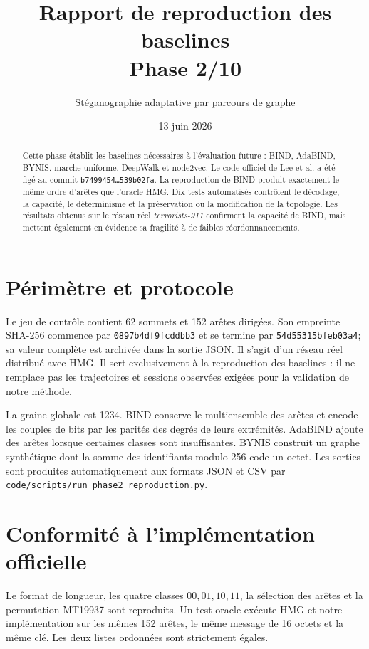 \documentclass[10pt,a4paper]{article}
\title{Rapport de reproduction des baselines\\Phase 2/10}
\author{Stéganographie adaptative par parcours de graphe}
\date{13 juin 2026}
\begin{document}
\maketitle

\begin{abstract}
Cette phase établit les baselines nécessaires à l'évaluation future :
BIND, AdaBIND, BYNIS, marche uniforme, DeepWalk et node2vec. Le code officiel
de Lee et al. a été figé au commit
\texttt{b7499454\ldots539b02fa}. La reproduction de BIND
produit exactement le même ordre d'arêtes que l'oracle HMG. Dix tests
automatisés contrôlent le décodage, la capacité, le déterminisme et la
préservation ou la modification de la topologie. Les résultats obtenus sur
le réseau réel \emph{terrorists-911} confirment la capacité de BIND, mais
mettent également en évidence sa fragilité à de faibles réordonnancements.
\end{abstract}

\section{Périmètre et protocole}

Le jeu de contrôle contient 62 sommets et 152 arêtes dirigées. Son empreinte
SHA-256 commence par \texttt{0897b4df}\allowbreak\texttt{9fcddbb3} et se
termine par \texttt{54d55315}\allowbreak\texttt{bfeb03a4}; sa valeur complète
est archivée dans la sortie JSON.
Il s'agit d'un réseau réel distribué avec HMG. Il sert exclusivement à la
reproduction des baselines : il ne remplace pas les trajectoires et sessions
observées exigées pour la validation de notre méthode.

La graine globale est 1234. BIND conserve le multiensemble des arêtes et
encode les couples de bits par les parités des degrés de leurs extrémités.
AdaBIND ajoute des arêtes lorsque certaines classes sont insuffisantes.
BYNIS construit un graphe synthétique dont la somme des identifiants modulo
256 code un octet. Les sorties sont produites automatiquement aux formats
JSON et CSV par \texttt{code/scripts/run\_phase2\_reproduction.py}.

\section{Conformité à l'implémentation officielle}

Le format de longueur, les quatre classes \(00,01,10,11\), la sélection des
arêtes et la permutation MT19937 sont reproduits. Un test oracle exécute HMG
et notre implémentation sur les mêmes 152 arêtes, le même message de 16 octets
et la même clé. Les deux listes ordonnées sont strictement égales.
\end{document}
